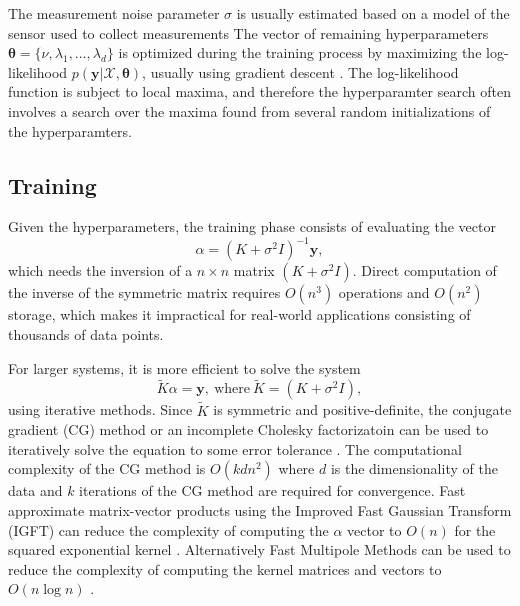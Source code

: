 \documentclass[letterpaper, 10 pt, conference]{ieeeconf}  %
\newcommand{\by}{\mathbf{y}}
\newcommand{\mX}{\mathcal{X}}
\begin{document}
The measurement noise parameter $\sigma$ is usually estimated based on a model of the sensor used to collect measurements
The vector of remaining hyperparameters $\boldsymbol{\theta} = \{\nu, \lambda_1,\ldots,\lambda_d\}$ is optimized during the training process by maximizing the log-likelihood $p(\by|\mX,\boldsymbol{\theta})$, usually using gradient descent \cite{rasmussen2006gaussian}.
The log-likelihood function is subject to local maxima, and therefore the hyperparamter search often involves a search over the maxima found from several random initializations of the hyperparamters.

\subsection{Training}
Given the hyperparameters, the training phase consists of evaluating the vector 
\begin{equation}
\alpha = (K + \sigma^2 I)^{-1}\by,
\end{equation}
which needs the inversion of a $n \times n$ matrix $(K + \sigma^2I)$. Direct computation of the inverse of the symmetric matrix requires $O(n^3)$ operations and $O(n^2)$ storage, which makes it impractical for real-world applications consisting of thousands of data points.

For larger systems, it is more efficient to solve the system
\begin{equation}
	\tilde{K}\alpha = \by, ~\text{where} ~\tilde{K} = (K + \sigma^2I),
\end{equation}
using iterative methods. Since $\tilde{K}$ is symmetric and positive-definite, the conjugate gradient (CG) method or an incomplete Cholesky factorizatoin can be used to iteratively solve the equation to some error tolerance \cite{gibbs1997}.
The computational complexity of the CG method is $O(kdn^2)$ where $d$ is the dimensionality of the data and $k$ iterations of the CG method are required for convergence.
Fast approximate matrix-vector products using the Improved Fast Gaussian Transform (IGFT) can reduce the complexity of computing the $\alpha$ vector to $O(n)$ for the squared exponential kernel \cite{raykar2007}.
Alternatively Fast Multipole Methods can be used to reduce the complexity of computing the kernel matrices and vectors to $O(n \log n)$ \cite{gumerov2005fast}.
\end{document}
